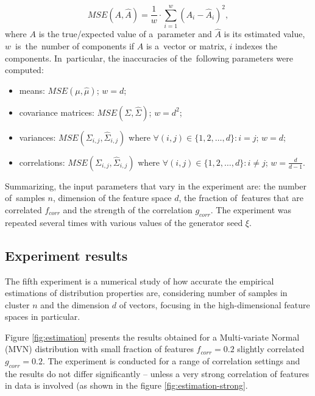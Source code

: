 \begin{itemize}
          \begin{equation}
              MSE(A, \hat{A})
              =
              \frac{1}{w}
              \cdot
              \sum_{i=1}^{w}
              \left(
                  A_i - \hat{A}_i
              \right)^2
              ,
              \label{eq:MSE}
          \end{equation}
          where $A$ is the true/expected value of a~parameter and $\hat{A}$ is its estimated value, $w$~is~the~number of components if $A$ is a~vector or matrix, $i$ indexes the components. In~particular, the inaccuracies of the~following parameters were computed:
          \begin{itemize}
              \item means: $MSE(\mu, \hat{\mu})$;
                    $w = d$;
              \item covariance matrices: $MSE(\Sigma, \hat{\Sigma})$;
                    $w = d^2$;
              \item variances: $MSE(\Sigma_{i,j}, \hat{\Sigma}_{i,j})$
                    where
                    $\forall (i, j) \in \{1, 2, \dots, d\}: i = j$;
                    $w = d$;
              \item correlations: $MSE(\Sigma_{i,j}, \hat{\Sigma}_{i,j})$
                    where
                    $\forall (i, j) \in \{1, 2, \dots, d\}: i \neq j$;
                    $w = \frac{d}{d - 1}$.
          \end{itemize}
\end{itemize}

Summarizing, the input parameters that vary in the experiment are: the number of~samples $n$, dimension of the feature space $d$, the fraction of~features that are correlated $f_{corr}$ and the strength of the correlation $g_{corr}$. The experiment was repeated several times with various values of the generator seed $\xi$.


\subsection{Experiment results}
\label{section:estimation-results}

The fifth experiment is a numerical study of how accurate the empirical estimations of distribution properties are, considering number of samples in cluster $n$ and the dimension $d$ of vectors, focusing in the high-dimensional feature spaces in particular.

Figure \ref{fig:estimation} presents the results obtained for a Multi-variate Normal (MVN) distribution with small fraction of features $f_{corr} = 0.2$ slightly correlated $g_{corr} = 0.2$. The experiment is conducted for a range of correlation settings and the results do not differ significantly – unless a very strong correlation of features in data is involved (as shown in the figure \ref{fig:estimation-strong}.

